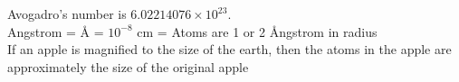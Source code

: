 \documentclass{article} %
\begin{document}
%
Avogadro's number is \ensuremath{6.02214076 \times 10^{23}}.
\\
Angstrom = Å = \ensuremath{10^{-8}} cm = Atoms are 1 or 2 Ångstrom in radius
\\
If an apple is magnified to the size of the earth, then the atoms in the apple are approximately the size of the original apple
\\
\end{document}
